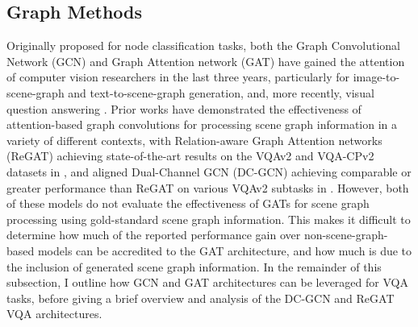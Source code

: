 




  




\subsection{Graph Methods}

Originally proposed for node classification tasks, both the Graph Convolutional Network (GCN) \cite{kipf2016semi} and Graph Attention network (GAT) \cite{velivckovic2017graph} have gained the attention of computer vision researchers in the last three years, particularly for image-to-scene-graph \cite{yang2018graph} and text-to-scene-graph \cite{han2020victr} generation, and, more recently, visual question answering \cite{li2019relation, huang2020aligned}.
Prior works have demonstrated the effectiveness of attention-based graph convolutions for processing scene graph information in a variety of different contexts, with Relation-aware Graph Attention networks (ReGAT) \cite{li2019relation} achieving state-of-the-art results on the VQAv2 and VQA-CPv2 datasets in \citeyear{li2019relation}, and aligned Dual-Channel GCN (DC-GCN) \cite{huang2020aligned} achieving comparable or greater performance than ReGAT on various VQAv2 subtasks in \citeyear{huang2020aligned}. However, both of these models do not evaluate the effectiveness of GATs for scene graph processing using gold-standard scene graph information. This makes it difficult to determine how much of the reported performance gain over non-scene-graph-based models can be accredited to the GAT architecture, and how much is due to the inclusion of generated scene graph information. In the remainder of this subsection, I outline how GCN and GAT architectures can be leveraged for VQA tasks, before giving a brief overview and analysis of the DC-GCN and ReGAT VQA architectures.

